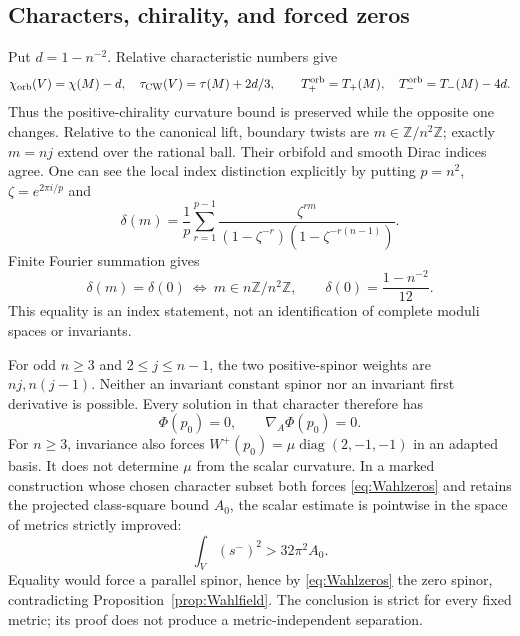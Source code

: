 \documentclass[11pt,a4paper]{article}
\theoremstyle{definition}\newtheorem{definition}[theorem]{Definition}
\theoremstyle{remark}\newtheorem{remark}[theorem]{Remark}
\newcommand{\Z}{\mathbb Z}
\newcommand{\orb}{\mathrm{orb}}
\begin{document}
\subsection{Characters, chirality, and forced zeros}
Put $d=1-n^{-2}$. Relative characteristic numbers give
\begin{equation}\label{eq:WahlT}
 \chi_\orb(V)=\chi(M)-d,\quad\tau_{\rm CW}(V)=\tau(M)+2d/3,
 \qquad T_+^\orb=T_+(M),\quad T_-^\orb=T_-(M)-4d.
\end{equation}
Thus the positive-chirality curvature bound is preserved while the opposite one changes.
Relative to the canonical lift, boundary twists are $m\in\Z/n^2\Z$; exactly $m=nj$ extend over the rational ball. Their orbifold and smooth Dirac indices agree. One can see the local index distinction explicitly by putting $p=n^2$, $\zeta=e^{2\pi i/p}$ and
\[
 \delta(m)=\frac1p\sum_{r=1}^{p-1}
 \frac{\zeta^{rm}}{(1-\zeta^{-r})(1-\zeta^{-r(n-1)})}.
\]
Finite Fourier summation gives
\[
 \delta(m)=\delta(0)\ \Longleftrightarrow\ m\in n\Z/n^2\Z,
 \qquad \delta(0)=\frac{1-n^{-2}}{12}.
\]
This equality is an index statement, not an identification of complete moduli spaces or invariants.

For odd $n\ge3$ and $2\le j\le n-1$, the two positive-spinor weights are $nj,n(j-1)$. Neither an invariant constant spinor nor an invariant first derivative is possible. Every solution in that character therefore has
\begin{equation}\label{eq:Wahlzeros}
 \Phi(p_0)=0,\qquad\nabla_A\Phi(p_0)=0.
\end{equation}
For $n\ge3$, invariance also forces
$W^+(p_0)=\mu\operatorname{diag}(2,-1,-1)$ in an adapted basis. It does not determine $\mu$ from the scalar curvature. In a marked construction whose chosen character subset both forces \eqref{eq:Wahlzeros} and retains the projected class-square bound $A_0$, the scalar estimate is pointwise in the space of metrics strictly improved:
\[
 \int_V(s^-)^2>32\pi^2A_0.
\]
Equality would force a parallel spinor, hence by \eqref{eq:Wahlzeros} the zero spinor, contradicting Proposition~\ref{prop:Wahlfield}. The conclusion is strict for every fixed metric; its proof does not produce a metric-independent separation.
\end{document}
